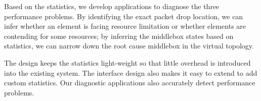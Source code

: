Based on the statistics, we develop applications to diagnose the three
performance problems. By identifying the exact packet drop location, 
we can infer whether
an element is facing resource limitation or whether elements are contending
for some resources; by inferring the middlebox states based on statistics, 
we can narrow down the root cause middlebox in the virtual topology.

The \Name design keeps the statistics light-weight so that little
overhead is introduced into the existing system. The interface
design also makes it easy to extend to add custom statistics. Our \Name
diagnostic applications also accurately detect performance problems.


